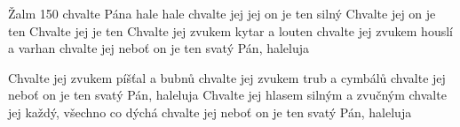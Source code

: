 \begin{TEXT}{Žalm 150}
\REFREN   {} chvalte Pána \NL
hale   \NL
hale chvalte   \NL
{} jej   
\SLOKA {} jej  on je ten silný \NL
Chvalte jej  on je ten  \NL
Chvalte jej   je ten    
\SLOKA Chvalte jej zvukem kytar a louten \NL
chvalte jej zvukem houslí a varhan \NL
chvalte jej neboť on je ten svatý Pán, haleluja 

\SLOKA Chvalte jej zvukem píšťal a bubnů \NL
chvalte jej zvukem trub a cymbálů \NL
chvalte jej neboť on je ten svatý Pán, haleluja 
\SLOKA Chvalte jej hlasem silným a zvučným \NL
chvalte jej každý, všechno co dýchá \NL
chvalte jej neboť on je ten svatý Pán, haleluja \NL
\end{TEXT}
